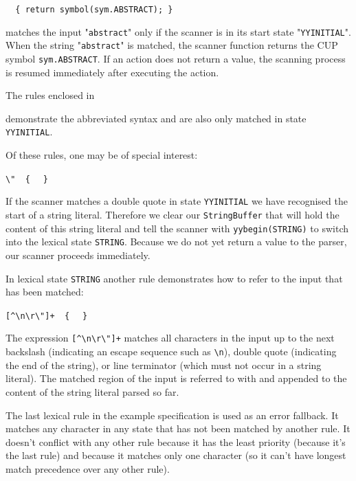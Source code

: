 \documentclass[11pt]{scrartcl}
\newcommand{\bl}{\latex{\symbol{123}}\html{\{}}
\newcommand{\br}{\latex{\symbol{125}}\html{\}}}
\begin{document}
{\tt{}\verb+  {+ return symbol(sym.ABSTRACT); \verb+}+}

matches the input "\texttt{abstract}" only if the scanner is in its
start state "\texttt{YYINITIAL}". When the string "\texttt{abstract}" is
matched, the scanner function returns the CUP symbol \texttt{sym.ABSTRACT}.
If an action does not return a value, the scanning process is resumed immediately 
after executing the action.
\label{ExampleRulesBunch}

The rules enclosed in

\texttt{\htmlref{<YYINITIAL> \bl \\
\ \ ...\\
\br}{CodeRulesBunch}}

demonstrate the abbreviated syntax and are also only matched in state \texttt{YYINITIAL}.
\label{ExampleRulesYYbegin}

Of these rules, one may be of special interest:

\verb+\"  { + \texttt{}\verb+ }+

If the scanner matches a double quote in state \texttt{YYINITIAL} we
have recognised the start of a string literal. Therefore we clear our \texttt{StringBuffer}
that will hold the content of this string literal and tell the scanner
with \texttt{yybegin(STRING)} to switch into the lexical state \texttt{STRING}.
Because we do not yet return a value to the parser, our scanner proceeds
immediately.
\label{ExampleRulesYYtext}

In lexical state \texttt{STRING} another
rule demonstrates how to refer to the input that has been matched:

\verb-[^\n\r\"]+  { - \texttt{}\verb+ }+

The expression \verb-[^\n\r\"]+- matches
all characters in the input up to the next backslash (indicating an
escape sequence such as \verb+\n+), double quote (indicating the end
of the string), or line terminator (which must not occur in a string literal).
The matched region of the input is referred to with \texttt{}
and appended to the content of the string literal parsed so far.
\label{ExampleRuleLast}

The last lexical rule in the example specification
is used as an error fallback. It matches any character in any state that
has not been matched by another rule. It doesn't conflict with any other
rule because it has the least priority (because it's the last rule) and
because it matches only one character (so it can't have longest match
precedence over any other rule).
 
\end{document}
